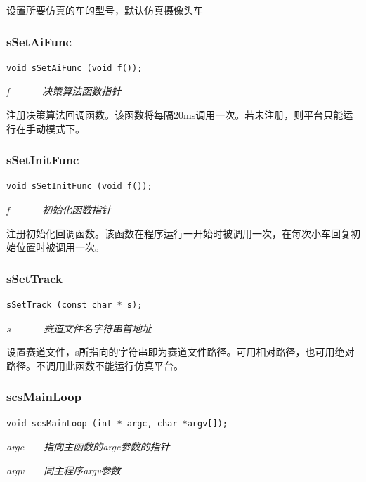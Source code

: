 \documentclass[titlepage,a4paper]{ctexart}
\begin{document}
设置所要仿真的车的型号，默认仿真摄像头车 \\

\subsubsection{sSetAiFunc}
\begin{lstlisting}[numbers=none]
void sSetAiFunc (void f());
\end{lstlisting}
\par \emph{f　　　 决策算法函数指针}

注册决策算法回调函数。该函数将每隔20ms调用一次。若未注册，则平台只能运行在手动模式下。 \\

\subsubsection{sSetInitFunc}
\begin{lstlisting}[numbers=none]
void sSetInitFunc (void f());
\end{lstlisting}
\par \emph{f　　　 初始化函数指针}

注册初始化回调函数。该函数在程序运行一开始时被调用一次，在每次小车回复初始位置时被调用一次。 \\

\subsubsection{sSetTrack}
\begin{lstlisting}[numbers=none]
sSetTrack (const char * s);
\end{lstlisting}
\par \emph{s　　　 赛道文件名字符串首地址}

设置赛道文件，s所指向的字符串即为赛道文件路径。可用相对路径，也可用绝对路径。不调用此函数不能运行仿真平台。 \\

\subsubsection{scsMainLoop}
\begin{lstlisting}[numbers=none]
void scsMainLoop (int * argc, char *argv[]);
\end{lstlisting}
\par \emph{argc　　指向主函数的argc参数的指针}
\par \emph{argv　　同主程序argv参数}
\end{document}
